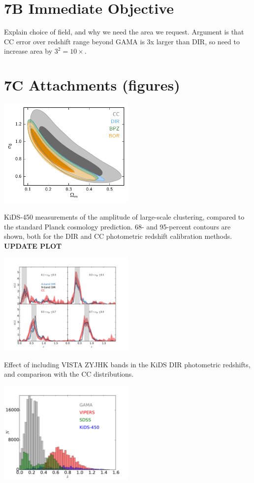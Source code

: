 \documentclass[a4paper, 10pt]{article}
\begin{document}
\section*{7B Immediate Objective}

Explain choice of field, and why we need the area we request. Argument is that CC error over redshift range beyond GAMA is 3x larger than DIR, so need to increase area by $3^2=10\times$.


\section*{7C Attachments (figures)}
\includegraphics[width=0.5\textwidth]{kids450_fig7.pdf}

KiDS-450 measurements of the amplitude of large-scale clustering, compared to the standard Planck cosmology prediction. 68- and 95-percent contours are shown, both for the DIR and CC photometric redshift calibration methods.  {\bf UPDATE PLOT}

\bigskip

\includegraphics[width=0.5\textwidth]{Nz_comp_zall_4vs9vsCC.pdf}

Effect of including VISTA ZYJHK bands in the KiDS DIR photometric redshifts, and comparison with the CC distributions.

\bigskip

\includegraphics[width=0.5\textwidth]{ESO_prop_plot_zdist.pdf}
\end{document}
